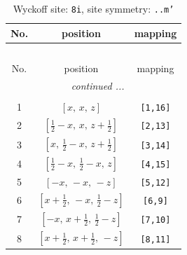 \documentclass[fleqn,8pt]{jsarticle}
\begin{document}
\begin{longtable}{ccc}
\caption{Wyckoff site: {\tt 8i}, site symmetry: {\tt ..m'}}
 \\
 \hline \hline
No. & position & mapping \\ \hline \endfirsthead

\multicolumn{2}{l}{\tablename\ \thetable{}} \\
 \hline \hline
No. & position & mapping \\ \hline \endhead

 \hline \hline
\multicolumn{2}{r}{\footnotesize\it continued ...} \\ \endfoot

 \hline \hline
\multicolumn{2}{r}{} \\ \endlastfoot

1 & $\left[ x,\, x,\, z \right]$ & {\tt [1,16]} \\ \hline
2 & $\left[ \frac{1}{2} - x,\, x,\, z + \frac{1}{2} \right]$ & {\tt [2,13]} \\ \hline
3 & $\left[ x,\, \frac{1}{2} - x,\, z + \frac{1}{2} \right]$ & {\tt [3,14]} \\ \hline
4 & $\left[ \frac{1}{2} - x,\, \frac{1}{2} - x,\, z \right]$ & {\tt [4,15]} \\ \hline
5 & $\left[ - x,\, - x,\, - z \right]$ & {\tt [5,12]} \\ \hline
6 & $\left[ x + \frac{1}{2},\, - x,\, \frac{1}{2} - z \right]$ & {\tt [6,9]} \\ \hline
7 & $\left[ - x,\, x + \frac{1}{2},\, \frac{1}{2} - z \right]$ & {\tt [7,10]} \\ \hline
8 & $\left[ x + \frac{1}{2},\, x + \frac{1}{2},\, - z \right]$ & {\tt [8,11]} \\
\end{longtable}
\renewcommand{\arraystretch}{1.2}
\end{document}
